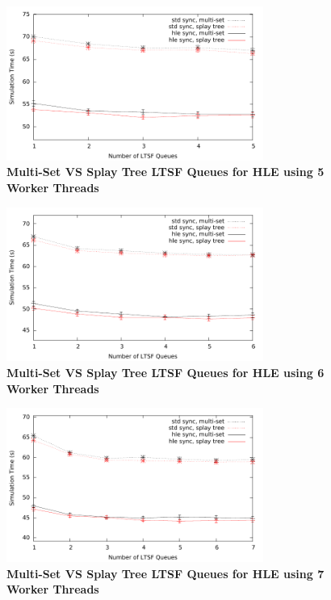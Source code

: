 \documentclass[11pt]{book}
\begin{document}
\begin{figure}
    \centering
    \graphicspath{ {./figures/} }
    \includegraphics[width=0.75\textwidth,keepaspectratio]{hugeepidemicsim-CONTmig-timeVSschedQs-msVSst-5thread-hle}
\caption{\textbf{Multi-Set VS Splay Tree LTSF Queues for HLE
     using 5 Worker Threads}}\label{fig:contThrMig_timeVSschq_5threads_msVSst_hle}
\end{figure}

\begin{figure}
    \centering
    \graphicspath{ {./figures/} }
    \includegraphics[width=0.75\textwidth,keepaspectratio]{hugeepidemicsim-CONTmig-timeVSschedQs-msVSst-6thread-hle}
\caption{\textbf{Multi-Set VS Splay Tree LTSF Queues for HLE
     using 6 Worker Threads}}\label{fig:contThrMig_timeVSschq_6threads_msVSst_hle}
\end{figure}

\begin{figure}
    \centering
    \graphicspath{ {./figures/} }
    \includegraphics[width=0.75\textwidth,keepaspectratio]{hugeepidemicsim-CONTmig-timeVSschedQs-msVSst-7thread-hle}
\caption{\textbf{Multi-Set VS Splay Tree LTSF Queues for HLE
     using 7 Worker Threads}}\label{fig:contThrMig_timeVSschq_7threads_msVSst_hle}
\end{figure}
\end{document}
